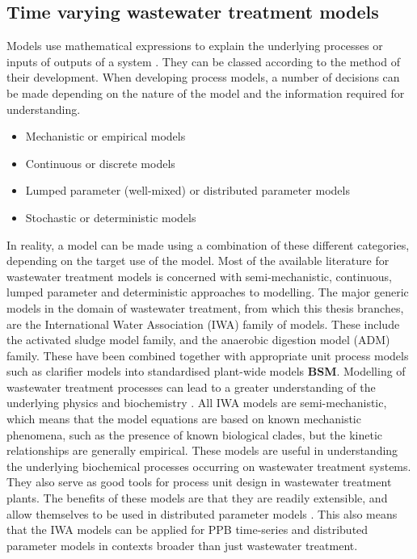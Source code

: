 \subsection{Time varying wastewater treatment models}
\label{ssec:chap1-wwtmod}
Models use mathematical expressions to explain the underlying processes or inputs of outputs of a system \cite{Hangos2001}. They can be classed according to the method of their development. When developing process models, a number of decisions can be made depending on the nature of the model and the information required for understanding.
\begin{itemize}
    \item Mechanistic or empirical models
    \item Continuous or discrete models
    \item Lumped parameter (well-mixed) or distributed parameter models
    \item Stochastic or deterministic models
\end{itemize}

In reality, a model can be made using a combination of these different categories, depending on the target use of the model. Most of the available literature for wastewater treatment models is concerned with semi-mechanistic, continuous, lumped parameter and deterministic approaches to modelling. The major generic models in the domain of wastewater treatment, from which this thesis branches, are the International Water Association (IWA) family of models. These include the activated sludge model family, and the anaerobic digestion model (ADM) \cite{Batstone2006} family. These have been combined together with appropriate unit process models such as clarifier models \cite{Takacs1991} into standardised plant-wide models \textbf{BSM}. Modelling of wastewater treatment processes can lead to a greater understanding of the underlying physics and biochemistry \cite{Szilvester2010}. All IWA models are semi-mechanistic, which means that the model equations are based on known mechanistic phenomena, such as the presence of known biological clades, but the kinetic relationships are generally empirical.
\skippingparagraph
These models are useful in understanding the underlying biochemical processes occurring on wastewater treatment systems. They also serve as good tools for process unit design in wastewater treatment plants. The benefits of these models are that they are readily extensible, and allow themselves to be used in distributed parameter models \cite{Batstone2006a}. This also means that the IWA models can be applied for PPB time-series and distributed parameter models in contexts broader than just wastewater treatment. 
